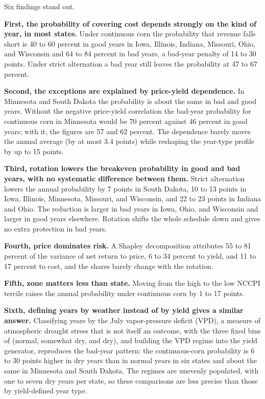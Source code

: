 \documentclass[11pt,letterpaper]{article}
\theoremstyle{remark}
\begin{document}
Six findings stand out.

\textbf{First, the probability of covering cost depends strongly on the kind of year, in most states.} Under continuous corn the probability that revenue falls short is 40 to 60 percent in good years in Iowa, Illinois, Indiana, Missouri, Ohio, and Wisconsin and 64 to 84 percent in bad years, a bad-year penalty of 14 to 30 points. Under strict alternation a bad year still leaves the probability at 47 to 67 percent.

\textbf{Second, the exceptions are explained by price-yield dependence.} In Minnesota and South Dakota the probability is about the same in bad and good years. Without the negative price-yield correlation the bad-year probability for continuous corn in Minnesota would be 70 percent against 46 percent in good years; with it, the figures are 57 and 62 percent. The dependence barely moves the annual average (by at most 3.4 points) while reshaping the year-type profile by up to 15 points.

\textbf{Third, rotation lowers the breakeven probability in good and bad years, with no systematic difference between them.} Strict alternation lowers the annual probability by 7 points in South Dakota, 10 to 13 points in Iowa, Illinois, Minnesota, Missouri, and Wisconsin, and 22 to 23 points in Indiana and Ohio. The reduction is larger in bad years in Iowa, Ohio, and Wisconsin and larger in good years elsewhere. Rotation shifts the whole schedule down and gives no extra protection in bad years.

\textbf{Fourth, price dominates risk.} A Shapley decomposition attributes 55 to 81 percent of the variance of net return to price, 6 to 34 percent to yield, and 11 to 17 percent to cost, and the shares barely change with the rotation.

\textbf{Fifth, zone matters less than state.} Moving from the high to the low NCCPI tercile raises the annual probability under continuous corn by 1 to 17 points.

\textbf{Sixth, defining years by weather instead of by yield gives a similar answer.} Classifying years by the July vapor-pressure deficit (VPD), a measure of atmospheric drought stress that is not itself an outcome, with the three fixed bins of \citet{Pizzo2025} (normal, somewhat dry, and dry), and building the VPD regime into the yield generator, reproduces the bad-year pattern: the continuous-corn probability is 6 to 30 points higher in dry years than in normal years in six states and about the same in Minnesota and South Dakota. The regimes are unevenly populated, with one to seven dry years per state, so these comparisons are less precise than those by yield-defined year type.
\end{document}
